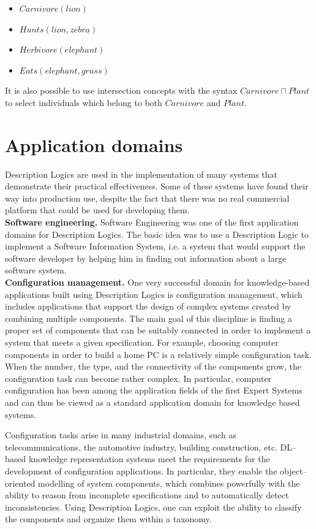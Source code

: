 \documentclass[a4paper, 11pt, oneside]{duthesis}
\begin{document}
\begin{itemize}
	\item $Carnivore(lion)$
	\item $Hunts(lion, zebra)$
	\item $Herbivore(elephant)$
	\item $Eats(elephant, grass)$
\end{itemize}

It is also possible to use intersection concepts with the syntax $Carnivore \sqcap Plant$ to select individuals which belong to both $Carnivore$ and $Plant$.


\section{Application domains}
Description Logics are used in the implementation of many systems that demonstrate their practical effectiveness. Some of these systems have found their way into production use, despite the fact that there was no real commercial platform that could be used for developing them.\\

\textbf{Software engineering.} Software Engineering was one of the first application domains for Description Logics. The basic idea was to use a Description Logic to implement a Software Information System, i.e. a system that would support the software developer by helping him in finding out information about a large software system.\\

\textbf{Configuration management.} One very successful domain for knowledge-based applications built using Description Logics is configuration management, which includes applications that support the design of complex systems created by combining multiple components.
The main goal of this discipline is finding a proper set of components that can be suitably connected in order to implement a system that meets a given specification.
For example, choosing computer components in order to build a home PC is a relatively simple configuration task.
When the number, the type, and the connectivity of the components grow, the configuration task can become rather complex.
In particular, computer configuration has been among the application fields of the first Expert Systems and can thus be viewed as a standard application domain for knowledge based systems.

Configuration tasks arise in many industrial domains, such as telecommunications, the automotive industry, building construction, etc.
DL--based knowledge representation systems meet the requirements for the development of configuration applications.
In particular, they enable the object--oriented modelling of system components, which combines powerfully with the ability to reason from incomplete specifications and to automatically detect inconsistencies.
Using Description Logics, one can exploit the ability to classify the components and organize them within a taxonomy.\\
\end{document}
